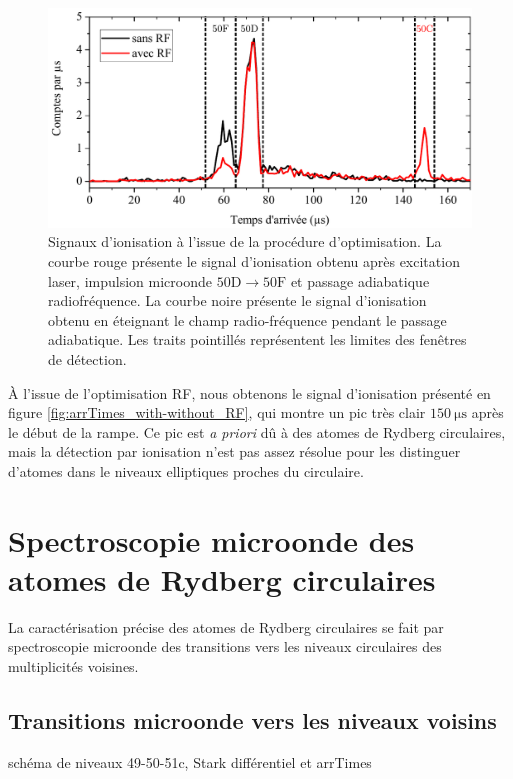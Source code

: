 %
\begin{figure}[!h]
\centering
\includegraphics[width=0.85\linewidth]{figures/circulars/arrTimes_with-without_RF}
\caption[Signaux d'ionisation des atomes circulaires]{
Signaux d'ionisation à l'issue de la procédure d'optimisation.
La courbe rouge présente le signal d'ionisation obtenu après excitation laser, impulsion microonde $\mathrm{50D \rightarrow 50F}$ et passage adiabatique radiofréquence.
La courbe noire présente le signal d'ionisation obtenu en éteignant le champ radio-fréquence pendant le passage adiabatique.
Les traits pointillés représentent les limites des fenêtres de détection.
}
\label{fig:arrTimes_with-without_RF}
\end{figure}
%
\`A l'issue de l'optimisation RF, nous obtenons le signal d'ionisation présenté en figure \eqref{fig:arrTimes_with-without_RF}, qui montre un pic très clair $\SI{150}{\us}$ après le début de la rampe.
Ce pic est \textit{a priori} dû à des atomes de Rydberg circulaires, mais la détection par ionisation n'est pas assez résolue pour les distinguer d'atomes dans le niveaux elliptiques proches du circulaire.

\section{Spectroscopie microonde des atomes de Rydberg circulaires}
\noindent La caractérisation précise des atomes de Rydberg circulaires se fait par spectroscopie microonde des transitions vers les niveaux circulaires des multiplicités voisines.

	\subsection{Transitions microonde vers les niveaux voisins}
\noindent schéma de niveaux 49-50-51c, Stark différentiel et arrTimes

